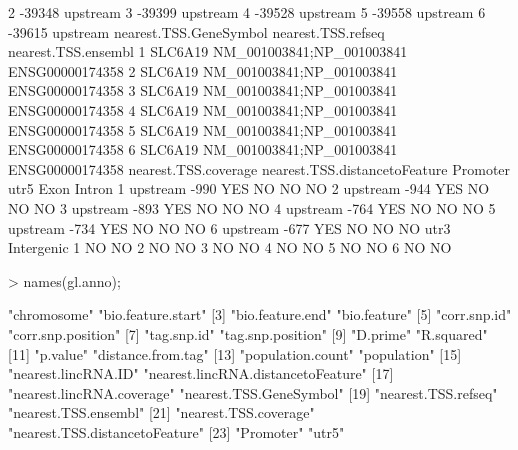 \documentclass[a4paper]{article}
\begin{document}
\begin{Schunk}
\begin{Soutput}
2                            -39348                 upstream
3                            -39399                 upstream
4                            -39528                 upstream
5                            -39558                 upstream
6                            -39615                 upstream
  nearest.TSS.GeneSymbol        nearest.TSS.refseq nearest.TSS.ensembl
1                SLC6A19 NM_001003841;NP_001003841     ENSG00000174358
2                SLC6A19 NM_001003841;NP_001003841     ENSG00000174358
3                SLC6A19 NM_001003841;NP_001003841     ENSG00000174358
4                SLC6A19 NM_001003841;NP_001003841     ENSG00000174358
5                SLC6A19 NM_001003841;NP_001003841     ENSG00000174358
6                SLC6A19 NM_001003841;NP_001003841     ENSG00000174358
  nearest.TSS.coverage nearest.TSS.distancetoFeature Promoter utr5 Exon Intron
1             upstream                          -990      YES   NO   NO     NO
2             upstream                          -944      YES   NO   NO     NO
3             upstream                          -893      YES   NO   NO     NO
4             upstream                          -764      YES   NO   NO     NO
5             upstream                          -734      YES   NO   NO     NO
6             upstream                          -677      YES   NO   NO     NO
  utr3 Intergenic
1   NO         NO
2   NO         NO
3   NO         NO
4   NO         NO
5   NO         NO
6   NO         NO
\end{Soutput}
\begin{Sinput}
> names(gl.anno);
\end{Sinput}
\begin{Soutput}
 [1] "chromosome"                        "bio.feature.start"                
 [3] "bio.feature.end"                   "bio.feature"                      
 [5] "corr.snp.id"                       "corr.snp.position"                
 [7] "tag.snp.id"                        "tag.snp.position"                 
 [9] "D.prime"                           "R.squared"                        
[11] "p.value"                           "distance.from.tag"                
[13] "population.count"                  "population"                       
[15] "nearest.lincRNA.ID"                "nearest.lincRNA.distancetoFeature"
[17] "nearest.lincRNA.coverage"          "nearest.TSS.GeneSymbol"           
[19] "nearest.TSS.refseq"                "nearest.TSS.ensembl"              
[21] "nearest.TSS.coverage"              "nearest.TSS.distancetoFeature"    
[23] "Promoter"                          "utr5"                             

\end{Soutput}
\end{Schunk}
\end{document}
